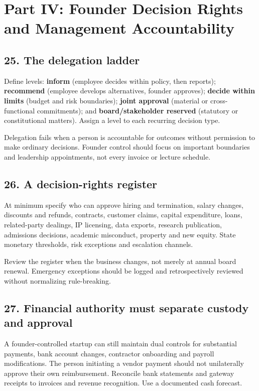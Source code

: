 \section*{Part IV: Founder Decision Rights and Management Accountability}

\subsection{25. The delegation ladder}

Define levels: \textbf{inform} (employee decides within policy, then reports); \textbf{recommend} (employee develops alternatives, founder approves); \textbf{decide within limits} (budget and risk boundaries); \textbf{joint approval} (material or cross-functional commitments); and \textbf{board/stakeholder reserved} (statutory or constitutional matters). Assign a level to each recurring decision type.

Delegation fails when a person is accountable for outcomes without permission to make ordinary decisions. Founder control should focus on important boundaries and leadership appointments, not every invoice or lecture schedule.

\subsection{26. A decision-rights register}

At minimum specify who can approve hiring and termination, salary changes, discounts and refunds, contracts, customer claims, capital expenditure, loans, related-party dealings, IP licensing, data exports, research publication, admissions decisions, academic misconduct, property and new equity. State monetary thresholds, risk exceptions and escalation channels.

Review the register when the business changes, not merely at annual board renewal. Emergency exceptions should be logged and retrospectively reviewed without normalizing rule-breaking.

\subsection{27. Financial authority must separate custody and approval}

A founder-controlled startup can still maintain dual controls for substantial payments, bank account changes, contractor onboarding and payroll modifications. The person initiating a vendor payment should not unilaterally approve their own reimbursement. Reconcile bank statements and gateway receipts to invoices and revenue recognition. Use a documented cash forecast.


